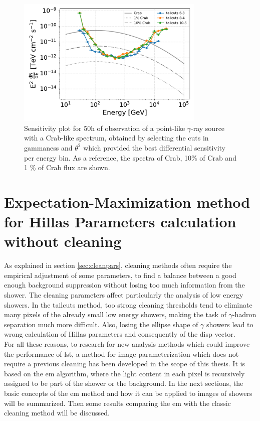 \documentclass[main.tex]{subfiles}
\begin{document}
\begin{figure}[h]
  \centering
  \includegraphics[width=0.8\textwidth]{Pictures/sensitivity.pdf}
  \caption{Sensitivity plot for 50h of observation of a point-like $\gamma$-ray source with a Crab-like spectrum, obtained by selecting the cuts in gammaness and $\theta^2$ which provided the best differential sensitivity per energy bin. As a reference, the spectra of Crab, 10\% of Crab and 1 \% of Crab flux are shown.}
  \label{fig:sens}
\end{figure}

\section[Expectation-Maximization method for Hillas Parameters...]{Expectation-Maximization method for Hillas Parameters calculation without cleaning} \label{sec:EM}

As explained in section \ref{sec:cleanpars}, cleaning methods often require the empirical adjustment of some parameters, to find a balance between a good enough background suppression without losing too much information from the shower. The cleaning parameters affect particularly the analysis of low energy showers. In the tailcuts method, too strong cleaning thresholds tend to eliminate many pixels of the already small low energy showers, making the task of $\gamma$-hadron separation much more difficult. Also, losing the ellipse shape of $\gamma$ showers lead to wrong calculation of Hillas parameters and consequently of the disp vector.\\
For all these reasons, to research for new analysis methods which could improve the performance of \gls{lst}, a method for image parameterization which does not require a previous cleaning has been developed in the scope of this thesis. It is based on the \gls{em} algorithm, where the light content in each pixel is recursively assigned to be part of the shower or the background. In the next sections, the basic concepts of the \gls{em} method and how it can be applied to images of showers will be summarized. Then some results comparing the \gls{em} with the classic cleaning method will be discussed.
\end{document}
